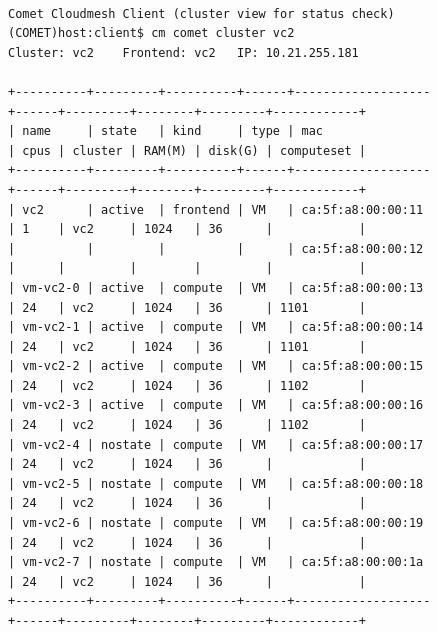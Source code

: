 \begin{figure}[htb] 
\begin{small}
\begin{verbatim}

Comet Cloudmesh Client (cluster view for status check)
(COMET)host:client$ cm comet cluster vc2
Cluster: vc2	Frontend: vc2	IP: 10.21.255.181

+----------+---------+----------+------+-------------------+------+---------+--------+---------+------------+
| name     | state   | kind     | type | mac               | cpus | cluster | RAM(M) | disk(G) | computeset |
+----------+---------+----------+------+-------------------+------+---------+--------+---------+------------+
| vc2      | active  | frontend | VM   | ca:5f:a8:00:00:11 | 1    | vc2     | 1024   | 36      |            |
|          |         |          |      | ca:5f:a8:00:00:12 |      |         |        |         |            |
| vm-vc2-0 | active  | compute  | VM   | ca:5f:a8:00:00:13 | 24   | vc2     | 1024   | 36      | 1101       |
| vm-vc2-1 | active  | compute  | VM   | ca:5f:a8:00:00:14 | 24   | vc2     | 1024   | 36      | 1101       |
| vm-vc2-2 | active  | compute  | VM   | ca:5f:a8:00:00:15 | 24   | vc2     | 1024   | 36      | 1102       |
| vm-vc2-3 | active  | compute  | VM   | ca:5f:a8:00:00:16 | 24   | vc2     | 1024   | 36      | 1102       |
| vm-vc2-4 | nostate | compute  | VM   | ca:5f:a8:00:00:17 | 24   | vc2     | 1024   | 36      |            |
| vm-vc2-5 | nostate | compute  | VM   | ca:5f:a8:00:00:18 | 24   | vc2     | 1024   | 36      |            |
| vm-vc2-6 | nostate | compute  | VM   | ca:5f:a8:00:00:19 | 24   | vc2     | 1024   | 36      |            |
| vm-vc2-7 | nostate | compute  | VM   | ca:5f:a8:00:00:1a | 24   | vc2     | 1024   | 36      |            |
+----------+---------+----------+------+-------------------+------+---------+--------+---------+------------+
\end{verbatim}
\end{small}
\end{figure}

